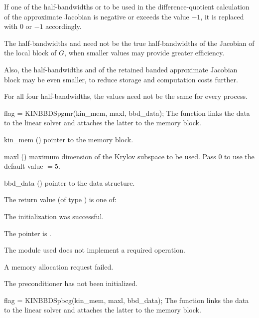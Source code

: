{
  If one of the half-bandwidths  or  to be used in the
  difference-quotient calculation of the approximate Jacobian is negative
  or exceeds the value $-1$, it is replaced with $0$ or
  $-1$ accordingly.

  The half-bandwidths  and  need
  not be the true half-bandwidths of the Jacobian of the local block of $G$,    
  when smaller values may provide greater efficiency.

  Also, the half-bandwidths  and  of the retained
  banded approximate Jacobian block may be even smaller, to reduce
  storage and computation costs further.

  For all four half-bandwidths, the values need not be the same for
  every process.
}
{
  flag = KINBBDSpgmr(kin\_mem, maxl, bbd\_data);
}
{
  The function  links the {\kinbbdpre} data to the
  {\kinspgmr} linear solver and attaches the latter to the {\kinsol}
  memory block.
}
{
  \begin{args}
  \item[kin\_mem] ()
    pointer to the {\kinsol} memory block.
  \item[maxl] ()
    maximum dimension of the Krylov subspace to be used. Pass $0$ to use the 
    default value $=5$.
  \item[bbd\_data] ()
    pointer to the {\kinbbdpre} data structure.
  \end{args}
}
{
  The return value  (of type ) is one of:
  \begin{args}
  \item[\Id{KINSPILS\_SUCCESS}] 
    The {\kinspgmr} initialization was successful.
  \item[\Id{KINSPILS\_MEM\_NULL}]
    The  pointer is .
  \item[\Id{KINSPILS\_ILL\_INPUT}]
    The {\nvector} module used does not implement a required operation.
  \item[\Id{KINSPILS\_MEM\_FAIL}]
    A memory allocation request failed.
  \item[\Id{KINBBDPRE\_PDATA\_NULL}]
    The {\kinbbdpre} preconditioner has not been initialized.
  \end{args}
}
{}
{
  flag = KINBBDSpbcg(kin\_mem, maxl, bbd\_data);
}
{
  The function  links the {\kinbbdpre} data to the
  {\kinspbcg} linear solver and attaches the latter to the {\kinsol}
  memory block.
}
